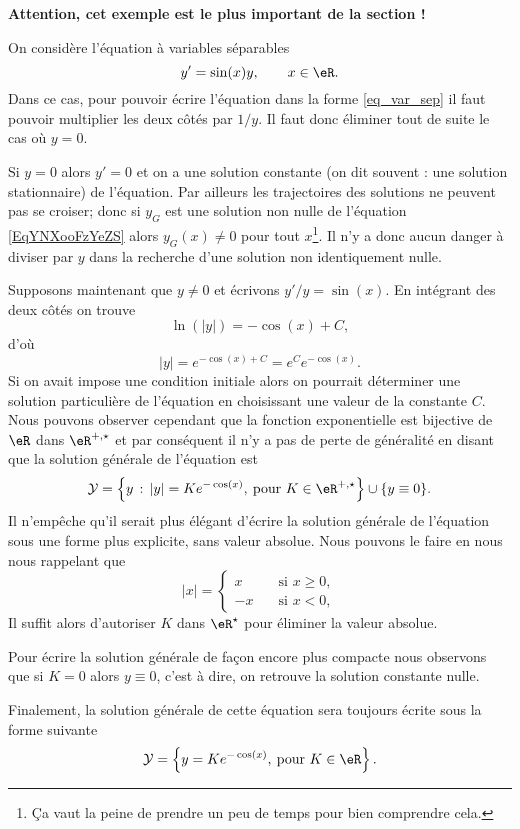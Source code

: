 \begin{example}\label{exemple_eq_hom}
	\textbf{Attention, cet exemple est le plus important de la section !}

	On considère l'équation à variables séparables
	\begin{equation}    \label{EqYNXooFzYeZS}
		y' = \sin(x) y , \qquad x\in\eR.
	\end{equation}
	Dans ce cas, pour pouvoir écrire l'équation dans la forme \eqref{eq_var_sep} il faut pouvoir multiplier les deux c\^otés par \( 1/y\). Il faut donc éliminer tout de suite le cas o\`u \( y = 0\).

	Si \( y= 0\) alors \( y' =0\) et on a une solution constante (on dit souvent : une solution stationnaire) de l'équation. Par ailleurs les trajectoires des solutions ne peuvent pas se croiser; donc si \( y_G\) est une solution non nulle de l'équation \eqref{EqYNXooFzYeZS} alors \( y_G(x)\neq 0\) pour tout \( x\)\footnote{Ça vaut la peine de prendre un peu de temps pour bien comprendre cela.}. Il n'y a donc aucun danger à diviser par \( y\) dans la recherche d'une solution non identiquement nulle.

	Supposons maintenant que \( y\neq 0\) et écrivons \( y'/y = \sin(x)\). En intégrant des deux côtés on trouve
	\[
		\ln(|y|) =- \cos(x) +C,
	\]
	d'où
	\[
		|y| = e^{- \cos(x) +C}= e^{C}e^{- \cos(x)}.
	\]
	Si on avait impose une condition initiale alors on pourrait déterminer une solution particulière de l'équation en choisissant une valeur de la constante \( C\). Nous pouvons observer cependant que la fonction exponentielle est bijective de \( \eR\) dans \( \eR^{+,\star}\) et par conséquent il n'y a pas de perte de généralité en disant que la solution générale de l'équation est
	\begin{equation*}
		\mathcal{Y} = \left\{ y \,:\, |y| = Ke^{- \cos(x)}, \:\text{pour } K\in\eR^{+,\star}\right\}\cup\{y\equiv 0\}.
	\end{equation*}
	Il n'empêche qu'il serait plus élégant d'écrire la solution générale de l'équation sous une forme plus explicite, sans valeur absolue. Nous pouvons le faire en nous nous rappelant que
	\begin{equation*}
		|x| =  \begin{cases}
			x  & \quad\text{si } x \geq 0 , \\
			-x & \quad\text{si } x <0 ,
		\end{cases}
	\end{equation*}
	Il suffit alors d'autoriser \( K\) dans \( \eR^{\star}\) pour éliminer la valeur absolue.

	Pour écrire la solution générale de façon encore plus compacte nous observons que si \( K=0\) alors \( y \equiv 0\), c'est \`a dire, on retrouve la solution constante nulle.

	Finalement, la solution générale de cette équation sera toujours écrite sous la forme suivante
	\begin{equation}
		\mathcal{Y} = \left\{ y = Ke^{- \cos(x)}, \:\text{pour } K\in\eR\right\}.
	\end{equation}
\end{example}

